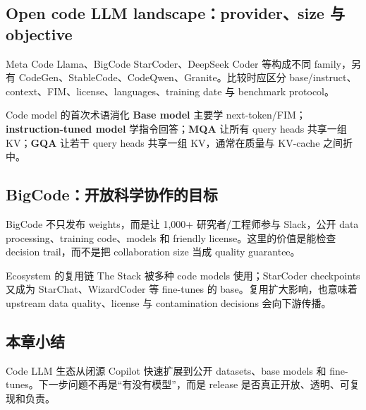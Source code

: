 \subsection{Open code LLM landscape：provider、size 与 objective}

Meta Code Llama、BigCode StarCoder、DeepSeek Coder 等构成不同 family，另有 CodeGen、StableCode、CodeQwen、Granite。比较时应区分 base/instruct、context、FIM、license、languages、training date 与 benchmark protocol。


\begin{knowledgebox}{Code model 的首次术语消化}
\textbf{Base model} 主要学 next-token/FIM；\textbf{instruction-tuned model} 学指令回答；\textbf{MQA} 让所有 query heads 共享一组 KV；\textbf{GQA} 让若干 query heads 共享一组 KV，通常在质量与 KV-cache 之间折中。
\end{knowledgebox}


\subsection{BigCode：开放科学协作的目标}

BigCode 不只发布 weights，而是让 1,000+ 研究者/工程师参与 Slack，公开 data processing、training code、models 和 friendly license。这里的价值是能检查 decision trail，而不是把 collaboration size 当成 quality guarantee。



\begin{importantbox}{Ecosystem 的复用链}
The Stack 被多种 code models 使用；StarCoder checkpoints 又成为 StarChat、WizardCoder 等 fine-tunes 的 base。复用扩大影响，也意味着 upstream data quality、license 与 contamination decisions 会向下游传播。
\end{importantbox}


\subsection{本章小结}

Code LLM 生态从闭源 Copilot 快速扩展到公开 datasets、base models 和 fine-tunes。下一步问题不再是“有没有模型”，而是 release 是否真正开放、透明、可复现和负责。

